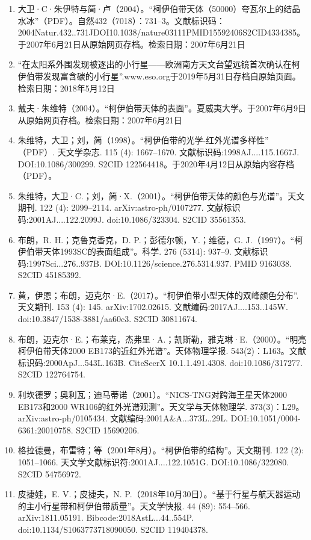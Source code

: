 \begin{enumerate}
\item 大卫·C·朱伊特与简·卢（2004）。“柯伊伯带天体（50000）夸瓦尔上的结晶水冰”（PDF）。自然432（7018）：731–3。文献标识码：2004Natur.432..731JDOI10.1038/nature03111PMID15592406S2CID4334385。于2007年6月21日从原始网页存档。检索日期：2007年6月21日
\item “在太阳系外围发现被逐出的小行星——欧洲南方天文台望远镜首次确认在柯伊伯带发现富含碳的小行星”.www.eso.org于2019年5月31日存档自原始页面。检索日期：2018年5月12日
\item 戴夫·朱维特（2004）。“柯伊伯带天体的表面”。夏威夷大学。于2007年6月9日从原始网页存档。检索日期：2007年6月21日
\item 朱维特，大卫；刘，简（1998）。“柯伊伯带的光学-红外光谱多样性” （PDF）. 天文学杂志. 115 (4): 1667–1670. 文献标识码:1998AJ....115.1667J. DOI:10.1086/300299. S2CID 122564418。于2020年4月12日从原始内容存档 （PDF）。
\item 朱维特，大卫·C.；刘，简·X.（2001）。“柯伊伯带天体的颜色与光谱”。天文期刊. 122 (4): 2099–2114. arXiv:astro-ph/0107277. 文献标识码:2001AJ....122.2099J. doi:10.1086/323304. S2CID 35561353.
\item 布朗，R. H.；克鲁克香克，D. P.；彭德尔顿，Y.；维德，G. J.（1997）。“柯伊伯带天体1993SC的表面组成”。科学. 276 (5314): 937–9. 文献标识码:1997Sci...276..937B. DOI:10.1126/science.276.5314.937. PMID 9163038. S2CID 45185392.
\item 黄，伊恩；布朗，迈克尔·E.（2017）。“柯伊伯带小型天体的双峰颜色分布”. 天文期刊. 153 (4): 145. arXiv:1702.02615. 文献编码:2017AJ....153..145W. doi:10.3847/1538-3881/aa60c3. S2CID 30811674.
\item 布朗，迈克尔·E.；布莱克，杰弗里·A.；凯斯勒，雅克琳·E.（2000）。“明亮柯伊伯带天体2000 EB173的近红外光谱”。天体物理学报. 543(2)：L163。文献标识码:2000ApJ...543L.163B. CiteSeerX 10.1.1.491.4308. doi:10.1086/317277. S2CID 122764754.
\item 利坎德罗；奥利瓦；迪马蒂诺（2001）。“NICS-TNG对跨海王星天体2000 EB173和2000 WR106的红外光谱观测”。天文学与天体物理学. 373(3)：L29。arXiv:astro-ph/0105434. 文献编码:2001A&A...373L..29L. DOI:10.1051/0004-6361:20010758. S2CID 15690206.
\item 格拉德曼，布雷特；等（2001年8月）。“柯伊伯带的结构”。天文期刊. 122 (2): 1051–1066. 天文学文献标识符:2001AJ....122.1051G. DOI:10.1086/322080. S2CID 54756972.
\item 皮捷娃，E. V.；皮捷夫，N. P.（2018年10月30日）。“基于行星与航天器运动的主小行星带和柯伊伯带质量”。天文学快报. 44 (89): 554–566. arXiv:1811.05191. Bibcode:2018AstL...44..554P. doi:10.1134/S1063773718090050. S2CID 119404378.

\end{enumerate}

